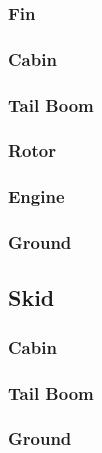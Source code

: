 \documentclass[12pt,a4paper]{article}
\begin{document}
\subsubsection{Fin}
\subsubsection{Cabin}
\subsubsection{Tail Boom}
\subsubsection{Rotor}
\subsubsection{Engine}
\subsubsection{Ground}
\subsection{Skid}
\subsubsection{Cabin}
\subsubsection{Tail Boom}
\subsubsection{Ground}
\end{document}
